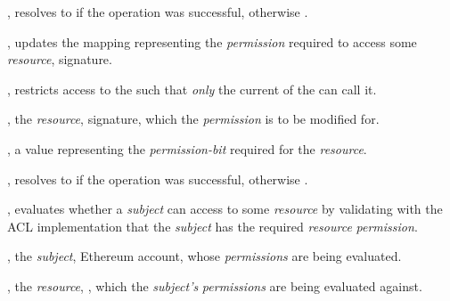 \begin{code}
\begin{functions}
    \begin{returns}
    \item {}, resolves to  if the operation was
      successful, otherwise .
    \end{returns}


  \item {},
    updates the mapping representing the \emph{permission} required to access
    some \emph{resource},  signature.

    \begin{modifiers}
    \item {}, restricts access to the
       such that \emph{only} the current  of the
       can call it.
    \end{modifiers}

    \begin{parameters}
    \item {}, the \emph{resource}, 
      signature, which the \emph{permission} is to be modified for.

    \item {}, a  value representing the
      \emph{permission-bit} required for the \emph{resource}.
    \end{parameters}

    \begin{returns}
    \item {}, resolves to  if the operation was
      successful, otherwise .
    \end{returns}


  \item {}, evaluates
    whether a \emph{subject} can access to some \emph{resource} by validating
    with the ACL implementation that the \emph{subject} has the required
    \emph{resource} \emph{permission}.

    \begin{parameters}
    \item {}, the \emph{subject}, Ethereum account,
      whose \emph{permissions} are being evaluated.

    \item {}, the \emph{resource}, , which the \emph{subject's} \emph{permissions} are being
      evaluated against.
    \end{parameters}


\end{functions}
\end{code}
